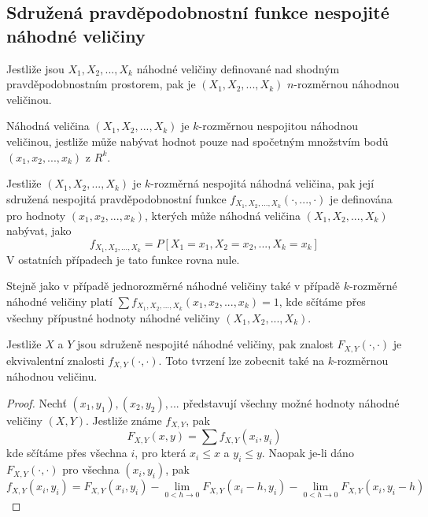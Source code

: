 \subsection{Sdružená pravděpodobnostní funkce nespojité náhodné veličiny}

Jestliže jsou $X_1, X_2, ..., X_k$ náhodné veličiny definované nad shodným pravděpodobnostním prostorem, pak je $(X_1, X_2, ..., X_k)$ $n$-rozměrnou náhodnou veličinou.

\begin{definition}
Náhodná veličina $(X_1, X_2, ..., X_k)$ je $k$-rozměrnou nespojitou náhodnou veličinou, jestliže může nabývat hodnot pouze nad spočetným množstvím bodů $(x_1, x_2, ..., x_k)$ z $R^k$.
\end{definition}

\begin{definition}
Jestliže $(X_1, X_2, ..., X_k)$ je $k$-rozměrná nespojitá náhodná veličina, pak její sdružená nespojitá pravděpodobnostní funkce $f_{X_1, X_2, ..., X_k}(\cdot, ..., \cdot)$ je definována pro hodnoty $(x_1, x_2, ..., x_k)$, kterých může náhodná veličina $(X_1, X_2, ..., X_k)$ nabývat, jako
\begin{equation*}
f_{X_1, X_2, ..., X_k} = P[X_1 = x_1, X_2 = x_2, ..., X_k = x_k]
\end{equation*}
V ostatních případech je tato funkce rovna nule.
\end{definition}
Stejně jako v případě jednorozměrné náhodné veličiny také v případě $k$-rozměrné náhodné veličiny platí $\sum f_{X_1, X_2, ..., X_k}(x_1, x_2, ..., x_k) = 1$, kde sčítáme přes všechny přípustné hodnoty náhodné veličiny $(X_1, X_2, ..., X_k)$.

\begin{theorem}
Jestliže $X$ a $Y$ jsou sdruženě nespojité náhodné veličiny, pak znalost $F_{X,Y}(\cdot, \cdot)$ je ekvivalentní znalosti $f_{X,Y}(\cdot, \cdot)$. Toto tvrzení lze zobecnit také na $k$-rozměrnou náhodnou veličinu.
\end{theorem}

\begin{proof}
Nechť $(x_1, y_1), (x_2, y_2), ...$ představují všechny možné hodnoty náhodné veličiny $(X, Y)$. Jestliže známe $f_{X,Y}$, pak
\begin{equation*}
F_{X,Y}(x,y) = \sum f_{X,Y}(x_i, y_i)
\end{equation*}
kde sčítáme přes všechna $i$, pro která $x_i \le x$ a $y_i \le y$. Naopak je-li dáno $F_{X,Y}(\cdot, \cdot)$ pro všechna $(x_i, y_i)$, pak
\begin{equation*}
f_{X,Y}(x_i, y_i) = F_{X,Y}(x_i, y_i) - \lim_{0 < h \rightarrow 0} F_{X,Y}(x_i - h, y_i) - \lim_{0 < h \rightarrow 0}F_{X,Y}(x_i, y_i - h)
\end{equation*}
\end{proof}

